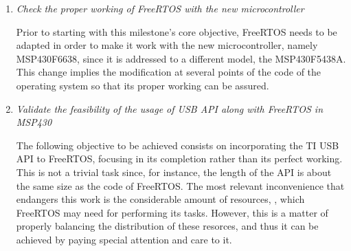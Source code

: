 		\begin{enumerate}
			\item \emph{Check the proper working of FreeRTOS with the new microcontroller}\\

				\begin{comment}
				Before to start the real objetive of this milestone we need to adapt the FreeRTOS main
				functionalities to the new MSP430, that been a new device was not actualy supported by. This mind
				the creation of a good number of new clases, most of them was excatly equal to their homonimes
				for the MSP430 5438A but other needs some little modifications.\\
				\end{comment}
				Prior to starting with this milestone's core objective, FreeRTOS needs to be adapted in order to
				make it work with the new microcontroller, namely MSP430F6638, since it is addressed to a
				different model, the MSP430F5438A. This change implies the modification at several points of the
				code of the operating system so that its proper working can be assured. 

			\item \emph{Validate the feasibility of the usage of USB API along with FreeRTOS in MSP430}\\

				\begin{comment}
				The next need in the milestone was port as soon as posible the TI USB API to a task-based SO like
				FreeRTOS whithout taking too much care about its correction. The introduction into the FreeRTOS
				was prety problematic because the size of just the the API was near to the size of the FreeRTOS.
				Plus, there are a very important risk, USB uses a important number of resources as pines or clock
				that can be also used by the FreeRTOS to another task, specially risky was the clock because both
				need a clock, but the selected board have 2 clock spots, and taking care in the port all this
				themes could resolved and everything works fine.\\
				\end{comment}
				The following objective to be achieved consists on incorporating the TI USB API to FreeRTOS,
				focusing in its completion rather than its perfect working. This is not a trivial task since, for
				instance, the length of the API is about the same size as the code of FreeRTOS. 
				The most relevant inconvenience that endangers this work is the considerable amount of resources,
				, which FreeRTOS may need for performing its tasks. However, this
				is a matter of properly balancing the distribution of these resorces, and thus it can be achieved
				by paying special attention and care to it.


\end{enumerate}
